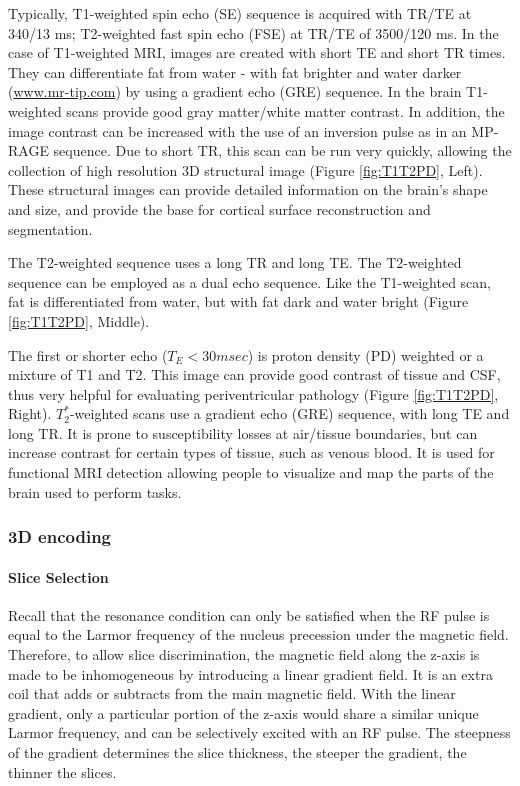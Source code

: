 Typically, T1-weighted spin echo (SE)  sequence is acquired with TR/TE at 340/13 ms; T2-weighted fast spin echo (FSE) at TR/TE of 3500/120 ms. 
In the case of T1-weighted MRI, images are created with short TE and short TR times. They can differentiate fat from water - with fat brighter and water darker (\url{www.mr-tip.com}) by using a gradient echo (GRE) sequence. In the brain T1-weighted scans provide good gray matter/white matter contrast. In addition, the image contrast can be increased with the use of an inversion pulse as in an MP-RAGE sequence. Due to short TR, this scan can be run very quickly, allowing the collection of high resolution 3D structural image (Figure \ref{fig:T1T2PD}, Left). These structural images can provide detailed information on the brain's shape and size, and provide the base for cortical surface reconstruction and segmentation. 

The T2-weighted sequence uses a long TR and long TE. The T2-weighted sequence can be employed as a dual echo sequence. Like the T1-weighted scan, fat is
differentiated from water, but with fat dark and water bright (Figure \ref{fig:T1T2PD}, Middle).  

The first or shorter echo ($T_E<30msec$) is proton density (PD) weighted or a mixture of T1 and T2. This image can provide good contrast of tissue and CSF, thus very helpful for evaluating periventricular pathology (Figure \ref{fig:T1T2PD}, Right). $T_2^*$-weighted scans use a gradient echo (GRE) sequence, with long TE and long TR. It is prone to susceptibility losses at air/tissue boundaries, but can increase contrast for certain types of tissue, such as venous blood. It is used for functional MRI detection allowing people to visualize and map the parts of the brain used to perform tasks. 

\subsubsection{3D encoding}

\paragraph{Slice Selection} Recall that the resonance condition can only be satisfied when the RF pulse is equal to the Larmor frequency of the nucleus precession under the magnetic field. 
Therefore, to allow slice discrimination, the magnetic field along the z-axis is made to be inhomogeneous by introducing a linear gradient field. It is an extra coil that adds or subtracts from the main magnetic field. With the linear gradient, only a particular portion of the z-axis would share a similar unique Larmor frequency, and can be selectively excited with an RF pulse. The steepness of the gradient determines the slice thickness, the steeper the gradient, the thinner the slices.  

